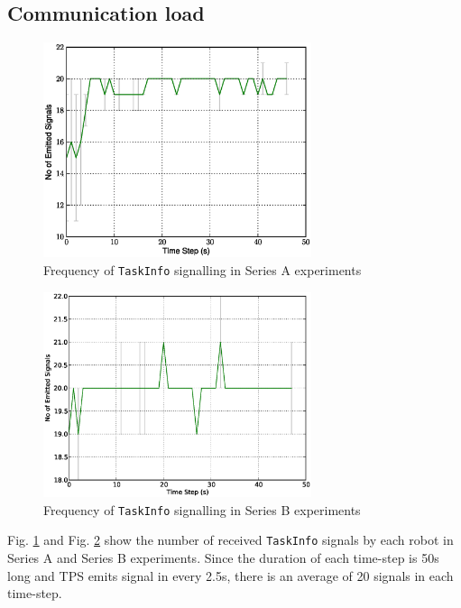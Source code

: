 \documentclass[smallcondensed]{svjour3}
\begin{document}
\subsection*{Communication load}
\begin{figure}
\centering
\includegraphics[width=0.7\textwidth]
{images/global-8robots/8Robot-SignalingFreqStat.eps}
\caption{\small Frequency of \texttt{TaskInfo} signalling in Series A experiments}
\label{fig:signal-frequency-stat-SA} 
\end{figure}
\begin{figure}
\centering
\includegraphics[width=0.7\textwidth]{images/Global-SignalingFreqStat.eps}
\caption{\small Frequency of \texttt{TaskInfo} signalling in Series B experiments}
\label{fig:signal-frequency-stat-SB} 
\end{figure}
Fig. \ref{fig:signal-frequency-stat-SA}  and Fig. \ref{fig:signal-frequency-stat-SB}  show the number of received \texttt{TaskInfo} signals by each robot in Series A and Series B experiments. Since the duration of each time-step is 50s long and TPS emits signal in every 2.5s, there is an average of 20 signals in each time-step.
\end{document}
